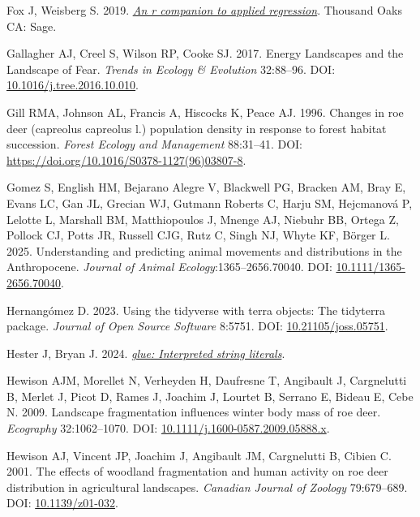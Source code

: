 \documentclass[10pt,a4paper]{article}
\newlength{\cslhangindent}
\newenvironment{CSLReferences}[2] %
 {\begin{list}{}{%
  \setlength{\itemindent}{0pt}
  \setlength{\leftmargin}{0pt}
  \setlength{\parsep}{0pt}
  \ifodd #1
   \setlength{\leftmargin}{\cslhangindent}
   \setlength{\itemindent}{-1\cslhangindent}
  \fi
  \setlength{\itemsep}{#2\baselineskip}}}
 {\end{list}}
\begin{document}
\begin{CSLReferences}{1}{0}
Fox J, Weisberg S. 2019. \emph{\href{https://socialsciences.mcmaster.ca/jfox/Books/Companion/index.html}{An r companion to applied regression}}. Thousand Oaks CA: Sage.

Gallagher AJ, Creel S, Wilson RP, Cooke SJ. 2017. Energy {Landscapes} and the {Landscape} of {Fear}. \emph{Trends in Ecology \& Evolution} 32:88--96. DOI: \href{https://doi.org/10.1016/j.tree.2016.10.010}{10.1016/j.tree.2016.10.010}.

Gill RMA, Johnson AL, Francis A, Hiscocks K, Peace AJ. 1996. Changes in roe deer (capreolus capreolus l.) population density in response to forest habitat succession. \emph{Forest Ecology and Management} 88:31--41. DOI: \url{https://doi.org/10.1016/S0378-1127(96)03807-8}.

Gomez S, English HM, Bejarano Alegre V, Blackwell PG, Bracken AM, Bray E, Evans LC, Gan JL, Grecian WJ, Gutmann Roberts C, Harju SM, Hejcmanová P, Lelotte L, Marshall BM, Matthiopoulos J, Mnenge AJ, Niebuhr BB, Ortega Z, Pollock CJ, Potts JR, Russell CJG, Rutz C, Singh NJ, Whyte KF, Börger L. 2025. Understanding and predicting animal movements and distributions in the {Anthropocene}. \emph{Journal of Animal Ecology}:1365--2656.70040. DOI: \href{https://doi.org/10.1111/1365-2656.70040}{10.1111/1365-2656.70040}.

Hernangómez D. 2023. Using the {tidyverse} with {terra} objects: The {tidyterra} package. \emph{Journal of Open Source Software} 8:5751. DOI: \href{https://doi.org/10.21105/joss.05751}{10.21105/joss.05751}.

Hester J, Bryan J. 2024. \emph{\href{https://CRAN.R-project.org/package=glue}{{glue}: Interpreted string literals}}.

Hewison AJM, Morellet N, Verheyden H, Daufresne T, Angibault J, Cargnelutti B, Merlet J, Picot D, Rames J, Joachim J, Lourtet B, Serrano E, Bideau E, Cebe N. 2009. Landscape fragmentation influences winter body mass of roe deer. \emph{Ecography} 32:1062--1070. DOI: \href{https://doi.org/10.1111/j.1600-0587.2009.05888.x}{10.1111/j.1600-0587.2009.05888.x}.

Hewison AJ, Vincent JP, Joachim J, Angibault JM, Cargnelutti B, Cibien C. 2001. The effects of woodland fragmentation and human activity on roe deer distribution in agricultural landscapes. \emph{Canadian Journal of Zoology} 79:679--689. DOI: \href{https://doi.org/10.1139/z01-032}{10.1139/z01-032}.


\end{CSLReferences}
\end{document}
